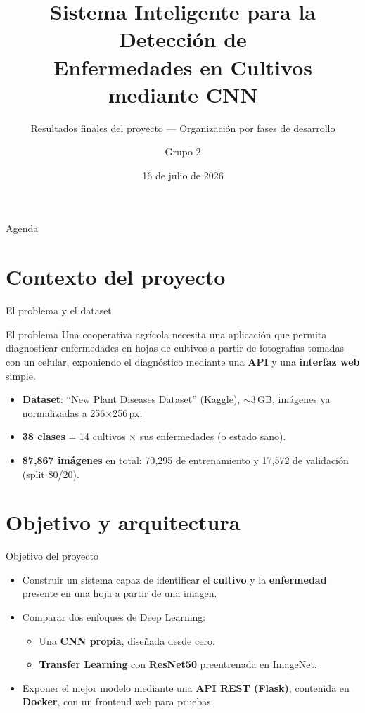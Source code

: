 \documentclass[aspectratio=169]{beamer}
\title[Detección de Enfermedades en Cultivos]{Sistema Inteligente para la Detección de\\Enfermedades en Cultivos mediante CNN}
\subtitle{Resultados finales del proyecto — Organización por fases de desarrollo}
\author{Grupo 2}
\date{16 de julio de 2026}
\begin{document}
\begin{frame}
  \titlepage
\end{frame}

\begin{frame}{Agenda}
  \tableofcontents
\end{frame}

\section{Contexto del proyecto}

\begin{frame}{El problema y el dataset}
  \begin{block}{El problema}
    Una cooperativa agrícola necesita una aplicación que permita diagnosticar enfermedades en hojas de cultivos a partir de fotografías tomadas con un celular, exponiendo el diagnóstico mediante una \textbf{API} y una \textbf{interfaz web} simple.
  \end{block}
  \begin{itemize}
    \item \textbf{Dataset}: ``New Plant Diseases Dataset'' (Kaggle), $\sim$3\,GB, imágenes ya normalizadas a 256$\times$256\,px.
    \item \textbf{38 clases} = 14 cultivos $\times$ sus enfermedades (o estado sano).
    \item \textbf{87{,}867 imágenes} en total: 70{,}295 de entrenamiento y 17{,}572 de validación (split 80/20).
  \end{itemize}
\end{frame}

\section{Objetivo y arquitectura}

\begin{frame}{Objetivo del proyecto}
  \begin{itemize}
    \item Construir un sistema capaz de identificar el \textbf{cultivo} y la \textbf{enfermedad} presente en una hoja a partir de una imagen.
    \item Comparar dos enfoques de Deep Learning:
    \begin{itemize}
      \item Una \textbf{CNN propia}, diseñada desde cero.
      \item \textbf{Transfer Learning} con \textbf{ResNet50} preentrenada en ImageNet.
    \end{itemize}
    \item Exponer el mejor modelo mediante una \textbf{API REST (Flask)}, contenida en \textbf{Docker}, con un frontend web para pruebas.
  \end{itemize}
\end{frame}
\end{document}
